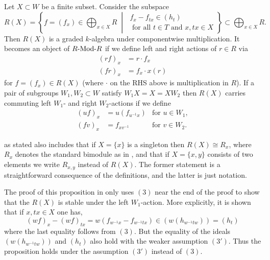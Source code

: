 \begin{prop*}\cite[Definition/Proposition 4.3.2]{WillSingular} \label{deprop-Wil 4.3.2}
Let $X \subset W$ be a finite subset. Consider the subspace
\begin{equation*}
R(X) = \left \{ f = (f_x) \in \bigoplus_{x \in X} R \; \middle | \; 
\begin{array}{c} f_x - f_{tx} \in (h_t) \\ \text{ for all } t \in T
\text{ and } x, tx \in X\end{array}  \right \} \subset \bigoplus_{x \in X} R.
\end{equation*}
Then $R(X)$ is a graded $k$-algebra under componentwise multiplication. 
It becomes an object of $\text{${R}$-Mod-${R}$}$ if we define left and right actions of $r \in R$ via
\begin{align*}
 (rf)_x & = r \cdot f_x \\
 (fr)_x & = f_x\cdot x(r)
\end{align*}
for $f = (f_x) \in R(X)$ (where $\cdot$ on the RHS above is multiplication in $R$).
If a pair of subgroups $W_1, W_2 \subset W$ satisfy $W_1X = X = XW_2$ then $R(X)$ carries commuting left $W_1$- and right $W_2$-actions if we define
\begin{align*}
  (uf)_x &= u(f_{u^{-1}x}) & \text{for $u \in W_1$},\\
  (fv)_x &= f_{xv^{-1}} & \text{for $v \in W_2$}.
\end{align*}
\end{prop*}
\begin{remark}
    \cite[Proposition 4.3.2]{WillSingular} as stated also includes that if $X = \{ x \}$ is a singleton then $R(X) \cong R_x$, where $R_x$ denotes the standard bimodule as in \cite[Definition 4.2.1]{WillSingular}, and that if $X = \{x, y \}$ consists of two elements we write $R_{x,y}$ instead of $R(X)$. The former statement is a straightforward consequence of the definitions, and the latter is just notation.
\end{remark}
The proof of this proposition in \cite{WillSingular} only uses $\hyperref[assumption 3]{(3)}$ near the end of the proof to show that the $R(X)$ is stable under the left $W_1$-action. More explicitly, it is shown that if $x, tx \in X$ one has,
\begin{equation*}
  (wf)_x - (wf)_{tx} = w(f_{w^{-1}x} - f_{w^{-1}tx}) \in (w(h_{w^{-1}tw})) = (h_t)
\end{equation*}
where the last equality follows from $\hyperref[assumption 3]{(3)}.$ But the equality of the ideals $(w(h_{w^{-1}tw}))$ and $(h_t)$ also hold with the weaker assumption $\hyperref[assumption 3']{(3')}$. Thus the proposition holds under the assumption $\hyperref[assumption 3']{(3')}$ instead of $\hyperref[assumption 3]{(3)}.$
\vspace{5pt}

